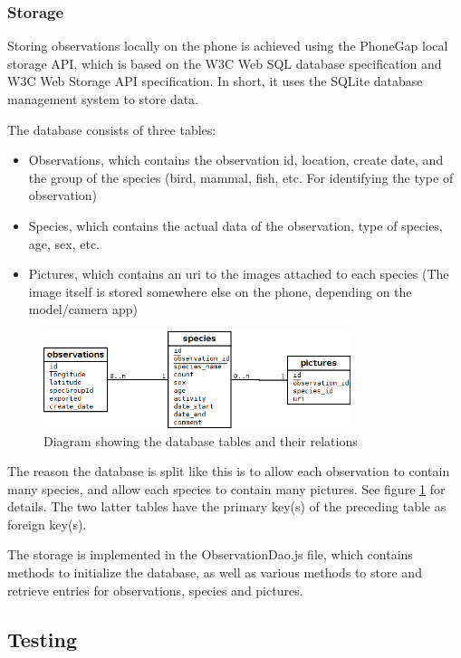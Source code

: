 	\subsubsection{Storage}
	Storing observations locally on the phone is achieved using the PhoneGap local storage API, which is based on the W3C Web SQL database specification and W3C Web Storage API specification. In short, it uses the SQLite database management system to store data.   

	The database consists of three tables: 
	\begin{itemize}
		\item Observations, which contains the observation id, location, create date, and the group of the species (bird, mammal, fish, etc. For identifying the type of observation)
		\item Species, which contains the actual data of the observation, type of species, age, sex, etc.
		\item Pictures, which contains an uri to the images attached to each species (The image itself is stored somewhere else on the phone, depending on the model/camera app)
	\end{itemize}
	
	\begin{figure}[htb]
		\centering
		\includegraphics[width=0.8\textwidth]{sprints/db_diagram.png}
		\caption{Diagram showing the database tables and their relations}
		\label{fig:dbdiagram}	
	\end{figure}
	
	The reason the database is split like this is to allow each observation to contain many species, and allow each species to contain many pictures. See figure \ref{fig:dbdiagram} for details. The two latter tables have the primary key(s) of the preceding table as foreign key(s).
	
	The storage is implemented in the ObservationDao.js file, which contains methods to initialize the database, as well as various methods to store and retrieve entries for observations, species and pictures.
				
\subsection{Testing}

